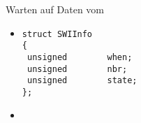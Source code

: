 \begin{frame}[fragile]{}{Warten auf Daten vom \ksp}
\begin{itemize}
 \item {}
  \begin{lstlisting}
struct SWIInfo
{
 unsigned        when;
 unsigned        nbr;
 unsigned        state;
};
  \end{lstlisting}
 \item \href{http://www.cplusplus.com/reference/istream/istream/}{}
\end{itemize}
\end{frame}

